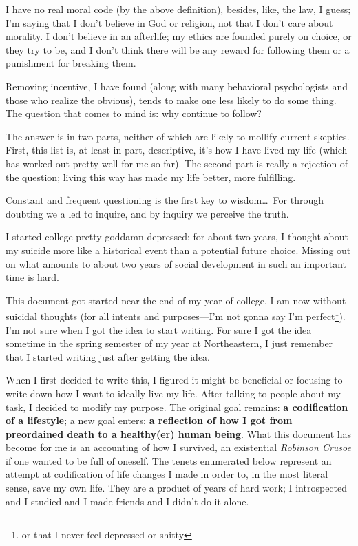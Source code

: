 \documentclass[./butidigress.tex]{subfiles}
\begin{document}
I have no real moral code (by the above definition), besides, like, the law, I guess; I'm saying that I don't believe in God or religion, not that I don't care about morality.
I don't believe in an afterlife; my ethics are founded purely on choice, or they try to be, and I don't think there will be any reward for following them or a punishment for breaking them.

Removing incentive, I have found (along with many behavioral psychologists and those who realize the obvious), tends to make one less likely to do some thing.
The question that comes to mind is: why continue to follow?

The answer is in two parts, neither of which are likely to mollify current skeptics.
First, this list is, at least in part, descriptive, it's how I have lived my life (which has worked out pretty well for me so far).
The second part is really a rejection of the question; living this way has made my life better, more fulfilling.

\label{sec:development}
\epigraph{Constant and frequent questioning is the first key to wisdom\ldots\ For through doubting we a led to inquire, and by inquiry we perceive the truth.}{}
I started college pretty goddamn depressed; for about two years, I thought about my suicide more like a historical event than a potential future choice.
Missing out on what amounts to about two years of social development in such an important time is hard.

This document got started near the end of my  year of college, I am now without suicidal thoughts (for all intents and purposes---I'm not gonna say I'm perfect\footnote{or that I never feel depressed or shitty}).
I'm not sure when I got the idea to start writing.
For sure I got the idea sometime in the spring semester of my  year at Northeastern, I just remember that I started writing just after getting the idea.

When I first decided to write this, I figured it might be beneficial or focusing to write down how I want to ideally live my life.
After talking to people about my task, I decided to modify my purpose.
The original goal remains: \textbf{a codification of a lifestyle}; a new goal enters: \textbf{a reflection of how I got from preordained death to a healthy(er) human being}.
What this document has become for me is an accounting of how I survived, an existential \textit{Robinson Crusoe} if one wanted to be full of oneself.
The tenets enumerated below represent an attempt at codification of life changes I made in order to, in the most literal sense, save my own life.
They are a product of years of hard work; I introspected and I studied and I made friends and I didn't do it alone.
\end{document}
